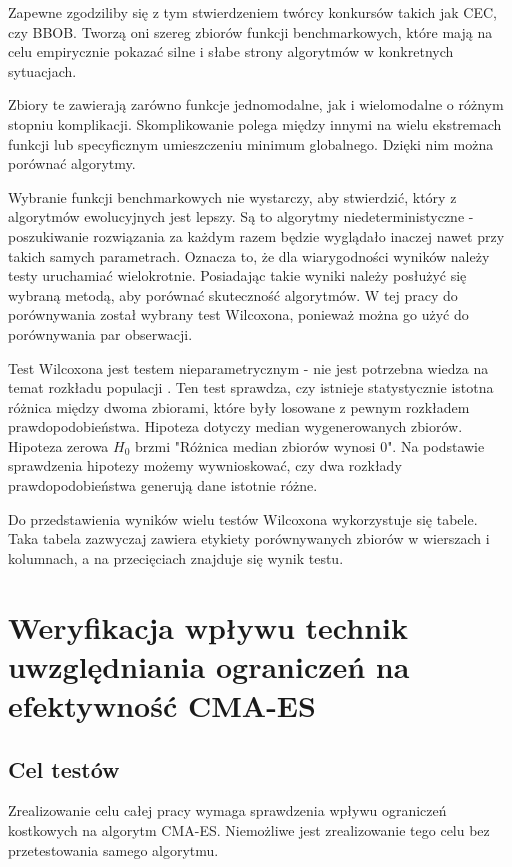 \documentclass{mini}
\newcommand{\CMAES}{\mbox{CMA-ES}}
\begin{document}
Zapewne zgodziliby się z tym stwierdzeniem twórcy konkursów takich jak CEC, czy BBOB. Tworzą oni szereg zbiorów funkcji benchmarkowych, które mają na celu empirycznie pokazać silne i słabe strony algorytmów w konkretnych sytuacjach.

Zbiory te zawierają zarówno funkcje jednomodalne, jak i wielomodalne o różnym stopniu komplikacji. Skomplikowanie polega między innymi na wielu ekstremach funkcji lub specyficznym umieszczeniu minimum globalnego. Dzięki nim można porównać algorytmy.

Wybranie funkcji benchmarkowych nie wystarczy, aby stwierdzić, który z algorytmów ewolucyjnych jest lepszy. Są to algorytmy niedeterministyczne - poszukiwanie rozwiązania za każdym razem będzie wyglądało inaczej nawet przy takich samych parametrach. Oznacza to, że dla wiarygodności wyników należy testy uruchamiać wielokrotnie. Posiadając takie wyniki należy posłużyć się wybraną metodą, aby porównać skuteczność algorytmów. W tej pracy do porównywania został wybrany test Wilcoxona, ponieważ można go użyć do porównywania par obserwacji.

Test Wilcoxona jest testem nieparametrycznym - nie jest potrzebna wiedza na temat rozkładu populacji \cite{wilcox}. Ten test sprawdza, czy istnieje statystycznie istotna różnica między dwoma zbiorami, które były losowane z pewnym rozkładem prawdopodobieństwa. Hipoteza dotyczy median wygenerowanych zbiorów. Hipoteza zerowa $H_0$ brzmi "Różnica median zbiorów wynosi 0". Na podstawie sprawdzenia hipotezy możemy wywnioskować, czy dwa rozkłady prawdopodobieństwa generują dane istotnie różne.

Do przedstawienia wyników wielu testów Wilcoxona wykorzystuje się tabele. Taka tabela zazwyczaj zawiera etykiety porównywanych zbiorów w wierszach i kolumnach, a na przecięciach znajduje się wynik testu.

\pagebreak

\section{Weryfikacja wpływu technik uwzględniania ograniczeń na efektywność CMA-ES}

\subsection{Cel testów}
\hspace{3,4ex}Zrealizowanie celu całej pracy wymaga sprawdzenia wpływu ograniczeń kostkowych na algorytm \CMAES. Niemożliwe jest zrealizowanie tego celu bez przetestowania samego algorytmu.
\end{document}
